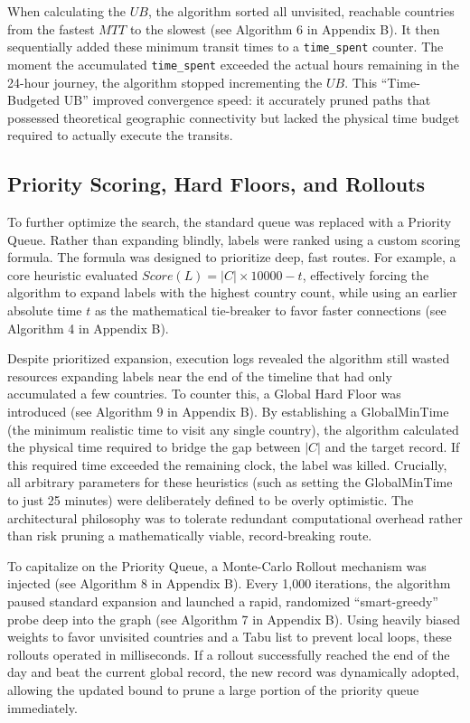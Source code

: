 \medskip

When calculating the $UB$, the algorithm sorted all unvisited, reachable countries from the fastest $MTT$ to the slowest (see Algorithm 6 in Appendix B). It then sequentially added these minimum transit times to a \texttt{time\_spent} counter. The moment the accumulated \texttt{time\_spent} exceeded the actual hours remaining in the 24-hour journey, the algorithm stopped incrementing the $UB$. This ``Time-Budgeted UB'' improved convergence speed: it accurately pruned paths that possessed theoretical geographic connectivity but lacked the physical time budget required to actually execute the transits.

\subsection{Priority Scoring, Hard Floors, and Rollouts}
\label{subsec:priority_scoring_hard_floors_rollouts}

To further optimize the search, the standard queue was replaced with a Priority Queue. Rather than expanding blindly, labels were ranked using a custom scoring formula. The formula was designed to prioritize deep, fast routes. For example, a core heuristic evaluated ${Score}(L) = |C| \times 10000 - t$, effectively forcing the algorithm to expand labels with the highest country count, while using an earlier absolute time $t$ as the mathematical tie-breaker to favor faster connections (see Algorithm 4 in Appendix B).

\medskip

Despite prioritized expansion, execution logs revealed the algorithm still wasted resources expanding labels near the end of the timeline that had only accumulated a few countries. To counter this, a Global Hard Floor was introduced (see Algorithm 9 in Appendix B). By establishing a GlobalMinTime (the minimum realistic time to visit any single country), the algorithm calculated the physical time required to bridge the gap between $|C|$ and the target record. If this required time exceeded the remaining clock, the label was killed. Crucially, all arbitrary parameters for these heuristics (such as setting the GlobalMinTime to just 25 minutes) were deliberately defined to be overly optimistic. The architectural philosophy was to tolerate redundant computational overhead rather than risk pruning a mathematically viable, record-breaking route.

\medskip

To capitalize on the Priority Queue, a Monte-Carlo Rollout mechanism was injected (see Algorithm 8 in Appendix B). Every 1,000 iterations, the algorithm paused standard expansion and launched a rapid, randomized ``smart-greedy'' probe deep into the graph (see Algorithm 7 in Appendix B). Using heavily biased weights to favor unvisited countries and a Tabu list to prevent local loops, these rollouts operated in milliseconds. If a rollout successfully reached the end of the day and beat the current global record, the new record was dynamically adopted, allowing the updated bound to prune a large portion of the priority queue immediately.

